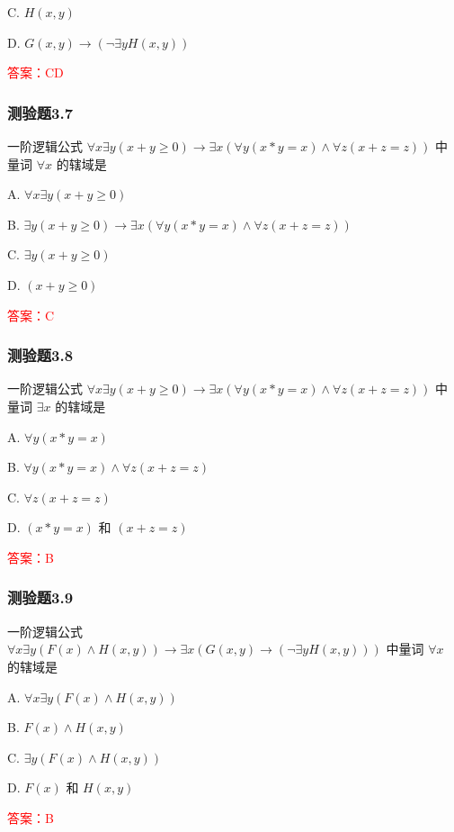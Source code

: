 \documentclass[UTF8, heading=true]{ctexart}
\begin{document}
C. $
H(x, y)
$

D. $
G(x, y) \rightarrow(\neg \exists y H(x, y))
$

\textcolor{red}{答案：CD}




\subsubsection{测验题3.7}

一阶逻辑公式 $\forall x \exists y(x+y \geq 0) \rightarrow \exists x(\forall y(x * y=x) \wedge \forall z(x+z=z))$ 中量词 $\forall x$ 的辖域是 $\qquad$

A. $\forall x \exists y(x+y \geq 0)$

B. $ \exists y(x+y \geq 0) \rightarrow \exists x(\forall y(x * y=x) \wedge \forall z(x+z=z))$

C. $\exists y(x+y \geq 0)$

D. $(x+y \geq 0)$

\textcolor{red}{答案：C}

\subsubsection{测验题3.8}

一阶逻辑公式 $\forall x \exists y(x+y \geq 0) \rightarrow \exists x(\forall y(x * y=x) \wedge \forall z(x+z=z))$ 中量词 $\exists x$ 的辖域是 $\qquad$

A. $ \forall y(x * y=x)$

B. $\forall y(x * y=x) \wedge \forall z(x+z=z)$

C. $\forall z(x+z=z)$

D. $(x * y=x)$ 和 $(x+z=z)$

\textcolor{red}{答案：B}

\subsubsection{测验题3.9}

一阶逻辑公式 $\forall x \exists y(F(x) \wedge H(x, y)) \rightarrow \exists x(G(x, y) \rightarrow(\neg \exists y H(x, y)))$ 中量词 $\forall x$ 的辖域是 $\qquad$

A. $\forall x \exists y(F(x) \wedge H(x, y))$

B. $F(x) \wedge H(x, y)$

C. $\exists y(F(x) \wedge H(x, y))$

D. $F(x)$ 和 $H(x, y)$

\textcolor{red}{答案：B}
\end{document}
